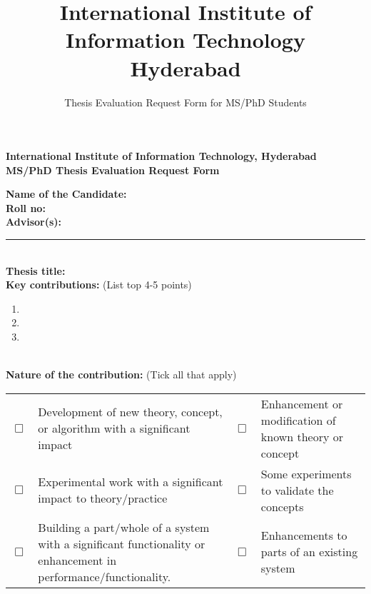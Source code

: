 \documentclass[11pt]{article}
\title{International Institute of Information Technology\\Hyderabad}
\author{Thesis Evaluation Request Form for MS/PhD Students}
\date{}
\begin{document}
\begin{center}
{\Large\bf International Institute of Information Technology, %
\large Hyderabad}\\[2mm]
{\large\bf MS/PhD Thesis Evaluation Request Form}\\[8mm]
\end{center}
\thispagestyle{empty}

{\bf Name of the Candidate:}\\[2mm]
{\bf Roll no:}%
\\[2mm]
{\bf Advisor(s):}\\[2mm]

\hrule
\ \\[-4mm]

{\bf Thesis title:}\\

{\bf Key contributions:} (List top 4-5 points)
\begin{enumerate}\itemsep=0mm
\item
\item
\item
\end{enumerate}

\ \\[-4mm]

{\bf Nature of the contribution:} (Tick all that apply)\vspace{-5mm}
\begin{center}
\begin{tabular}[2]{cp{}|cp{}}
$\Box$ & Development of new theory, concept, or algorithm with a
  significant impact &
$\Box$ & Enhancement or modification of known theory or concept \\[3mm]
$\Box$ & Experimental work with a significant impact to theory/practice &
$\Box$ & Some experiments to validate the concepts\\[3mm]
$\Box$ & Building a part/whole of a system with a significant
  functionality or enhancement in performance/functionality. &
$\Box$ & Enhancements to parts of an existing system \\
\end{tabular}
\end{center}

\ \\[7mm]
\end{document}
